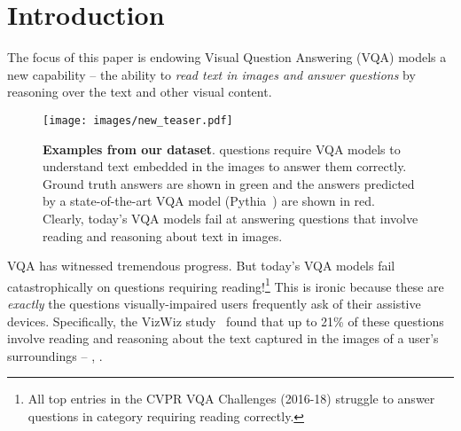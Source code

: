 \documentclass[10pt,twocolumn,letterpaper]{article}
\begin{document}
\section{Introduction}
\label{sec:intro}
The focus of this paper is endowing 
Visual Question Answering (VQA) 
models a new capability -- the ability to \emph{read text in images and answer questions} by reasoning over the text and other visual content. 

\begin{figure}[t]
    \centering
    \texttt{[image: images/new\_teaser.pdf]}    
    \caption{
    \textbf{Examples from our \datasetName dataset}. \datasetName questions require VQA models to understand text embedded in the images to answer them correctly. Ground truth answers are shown in green and the answers predicted by a state-of-the-art VQA model (Pythia~\cite{jiang2018pythia}) are shown in red.
    Clearly, today's VQA models fail at answering questions that involve reading and reasoning about text in images.
    }
    \label{fig:teaser}
    \vspace{-5mm}
\end{figure}
VQA has witnessed tremendous progress. But today's VQA models fail catastrophically on questions 
requiring reading!\footnote{All top entries in the CVPR VQA Challenges (2016-18) struggle to answer questions in category requiring reading correctly.}
This is ironic because these are \emph{exactly} the questions 
visually-impaired users frequently ask of their assistive devices. Specifically, the VizWiz study~\cite{bigham2010vizwiz} found that up to 21\% of these questions
involve reading and reasoning about the text captured in the images of a user's surroundings -- 
, 
.
\end{document}
